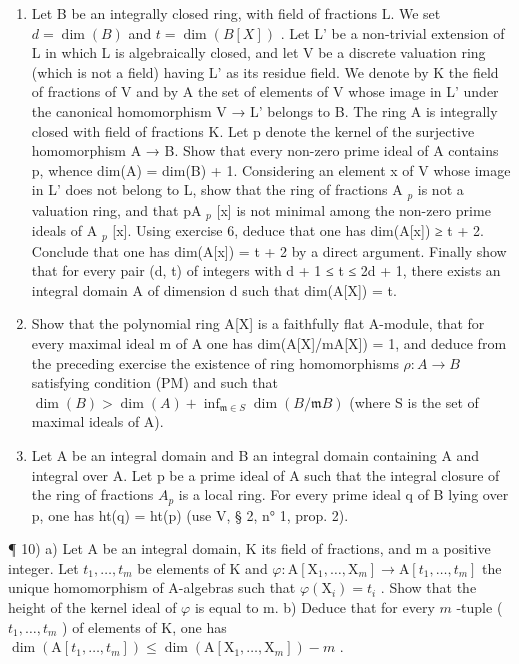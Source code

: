 \begin{enumerate}
\def\labelenumi{\arabic{enumi})}
\setcounter{enumi}{6}
\item
  Let B be an integrally closed ring, with field of fractions L. We set \(d = \dim(B)\) and \(t = \dim(B[X])\) . Let L' be a non-trivial extension of L in which L is algebraically closed, and let V be a discrete valuation ring (which is not a field) having L' as its residue field. We denote by K the field of fractions of V and by A the set of elements of V whose image in L' under the canonical homomorphism V → L' belongs to B. The ring A is integrally closed with field of fractions K. Let p denote the kernel of the surjective homomorphism A → B. Show that every non-zero prime ideal of A contains p, whence dim(A) = dim(B) + 1. Considering an element x of V whose image in L' does not belong to L, show that the ring of fractions A \(_{p}\) is not a valuation ring, and that pA \(_{p}\) {[}x{]} is not minimal among the non-zero prime ideals of A \(_{p}\) {[}x{]}. Using exercise 6, deduce that one has dim(A{[}x{]}) ≥ t + 2. Conclude that one has dim(A{[}x{]}) = t + 2 by a direct argument. Finally show that for every pair (d, t) of integers with d + 1 ≤ t ≤ 2d + 1, there exists an integral domain A of dimension d such that dim(A{[}X{]}) = t.
\item
  Show that the polynomial ring A{[}X{]} is a faithfully flat A-module, that for every maximal ideal m of A one has dim(A{[}X{]}/mA{[}X{]}) = 1, and deduce from the preceding exercise the existence of ring homomorphisms \(\rho: A \to B\) satisfying condition (PM) and such that \(\dim(B) > \dim(A) + \inf_{\mathfrak{m}\in S}\dim(B/\mathfrak{m}B)\) (where S is the set of maximal ideals of A).
\item
  Let A be an integral domain and B an integral domain containing A and integral over A. Let p be a prime ideal of A such that the integral closure of the ring of fractions \(A_{p}\) is a local ring. For every prime ideal q of B lying over p, one has ht(q) = ht(p) (use V, § 2, n° 1, prop. 2).
\end{enumerate}

¶ 10) a) Let A be an integral domain, K its field of fractions, and m a positive integer. Let \(t_1, \ldots, t_m\) be elements of K and \(\varphi: \mathrm{A}[\mathrm{X}_1, \ldots, \mathrm{X}_m] \to \mathrm{A}[t_1, \ldots, t_m]\) the unique homomorphism of A-algebras such that \(\varphi(\mathrm{X}_i) = t_i\) . Show that the height of the kernel ideal of \(\varphi\) is equal to m. b) Deduce that for every \(m\) -tuple ( \(t_1, \ldots, t_m\) ) of elements of K, one has \(\dim(\mathrm{A}[t_1, \ldots, t_m]) \leqslant \dim(\mathrm{A}[\mathrm{X}_1, \ldots, \mathrm{X}_m]) - m\) .

